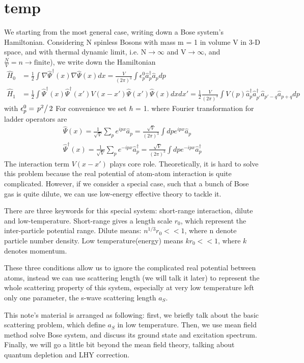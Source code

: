 \section{temp}
We starting from the most general case, writing down a Bose system's Hamiltonian. Considering N spinless Bosons with mass m = 1 in volume V in 3-D space, and with thermal dynamic limit, i.e. N$\to \infty $ and V$\to
\infty $, and $\frac{N}{V}=n\to \text{finite}$), we write down the Hamiltonian
\begin{equation}
\begin{split}
\hat{H}_0&=\frac{1}{2}\int\nabla\hat{\Psi}^\dagger(x)\nabla\hat{\Psi }(x)dx=\frac{V}{(2\pi)^3}\int\epsilon_p^0\hat{a}_p^\dagger\hat{a}_pdp\\
\hat{H}_1&=\frac{1}{2}\int\hat{\Psi}^\dagger(x)\hat{\Psi}^\dagger(x')V(x-x')\hat{\Psi}(x')\hat{\Psi}(x)dxdx'=\frac{1}{2}\frac{V}{(2\pi)^3}\int V(p)\hat{a}_p^\dagger\hat{a}_{p'}^\dagger\hat{a}_{p'-q}\hat{a}_{p+q}dp
\end{split}
\end{equation}
with $\epsilon _p^0=\left.p^2\right/2$
For convenience we set $\hbar $ = 1.
where Fourier transformation for ladder operators are
\begin{equation}
\begin{split}
\hat{\Psi}(x)=\frac{1}{\sqrt{V}}\sum_{p}e^{ipx}\hat{a}_p=\frac{\sqrt{V}}{(2\pi)^3}\int dp e^{i p x}\hat{a}_p\\
\hat{\Psi}^\dagger(x)=\frac{1}{\sqrt{V}}\sum_p e^{-i p x}\hat{a}_p^\dagger=\frac{\sqrt{V}}{(2\pi)^3}\int dp e^{-i p x}\hat{a}_p^\dagger
\end{split}
\end{equation}
The interaction term $V(x-x')$ plays core role. Theoretically, it is hard to solve this problem because the real potential of atom-atom interaction is quite complicated. However, if we consider a special case, such that a bunch of Bose gas is quite dilute, we can use low-energy effective theory to tackle it.

There are three keywords for this special system: short-range interaction, dilute and low-temperature. 
Short-range gives a length scale $r_0$, which represent the inter-particle potential range. 
Dilute means: $n^{1/3}r_0<<1$, where n denote particle number density. 
Low temperature(energy) means $k r_0<<1$, where $k$ denotes momentum.

These three conditions allow us to ignore the complicated real potential between atoms, instead we can use scattering length (we will talk it later) to represent the whole scattering property of this system, especially at very low temperature left only one parameter, the s-wave scattering length $a_S$.

This note's material is arranged as following: first, we briefly talk about the basic scattering problem, which define $a_S$ in low temperature.
Then, we use mean field method solve Bose system, and discuss its ground state and excitation spectrum. Finally, we will go a little bit beyond the mean field theory, talking about quantum depletion and LHY correction.

\chapterend

